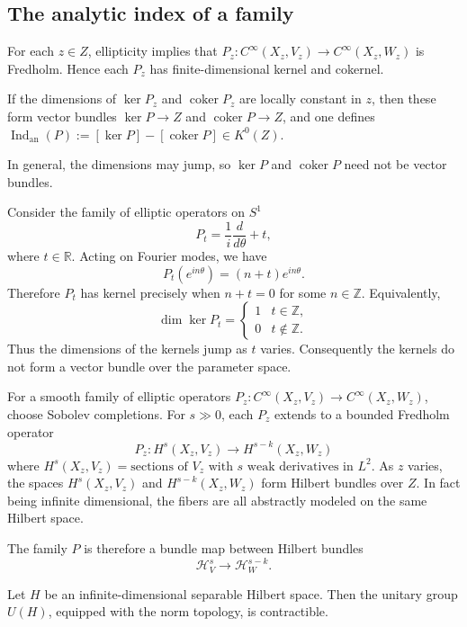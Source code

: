 \documentclass[12pt]{article}
\begin{document}
\subsection{The analytic index of a family}

\begin{theorem}
    For each $z\in Z$, ellipticity implies that $P_z:C^\infty(X_z,V_z)\to C^\infty(X_z,W_z)$ is Fredholm. Hence each $P_z$ has finite-dimensional kernel and cokernel.
\end{theorem}

If the dimensions of $\ker P_z$ and $\operatorname{coker}P_z$ are locally constant in $z$, then these form vector bundles $\ker P\to Z$ and $\operatorname{coker}P\to Z$, and one defines $\operatorname{Ind}_{\mathrm{an}}(P):=[\ker P]-[\operatorname{coker}P]\in K^0(Z)$.

In general, the dimensions may jump, so $\ker P$ and $\operatorname{coker}P$ need not be vector bundles. 

\begin{example}
Consider the family of elliptic operators on \(S^1\)
\[
P_t=\frac{1}{i}\frac{d}{d\theta}+t,
\]
where \(t\in \mathbb R\). Acting on Fourier modes, we have
\[
P_t(e^{in\theta})=(n+t)e^{in\theta}.
\]
Therefore \(P_t\) has kernel precisely when \(n+t=0\) for some \(n\in \mathbb Z\). Equivalently,
\[
\dim\ker P_t=
\begin{cases}
1 & t\in \mathbb Z,\\
0 & t\notin \mathbb Z.
\end{cases}
\]
Thus the dimensions of the kernels jump as \(t\) varies. Consequently the kernels do not form a vector bundle over the parameter space.
\end{example}

For a smooth family of elliptic operators \(P_z:C^\infty(X_z,V_z)\to C^\infty(X_z,W_z)\), choose Sobolev completions. For \(s\gg 0\), each \(P_z\) extends to a bounded Fredholm operator
\[
P_z:H^s(X_z,V_z)\to H^{s-k}(X_z,W_z)
\] where $H^s(X_z,V_z)=\text{sections of }V_z\text{ with }s\text{ weak derivatives in }L^2.$
As \(z\) varies, the spaces \(H^s(X_z,V_z)\) and \(H^{s-k}(X_z,W_z)\) form Hilbert bundles over \(Z\). In fact being infinite dimensional, the fibers are all abstractly modeled on the same Hilbert space. 

The family \(P\) is therefore a bundle map between Hilbert bundles
\[
\mathcal H^s_V\longrightarrow \mathcal H^{s-k}_W.
\]


\begin{theorem}
Let \(H\) be an infinite-dimensional separable Hilbert space. Then the unitary group \(U(H)\), equipped with the norm topology, is contractible.
\end{theorem}
\end{document}
